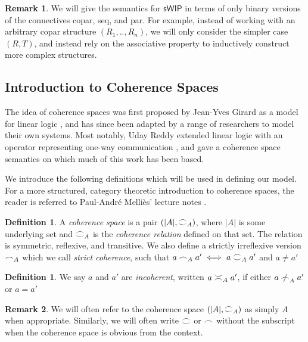 \documentclass[11pt, oneside]{article}
\theoremstyle{plain}
\theoremstyle{definition}
\newtheorem{definition}[theorem]{Definition}
\newtheorem*{remark}{Remark}
\newcommand{\sSys}{{\mathsf{sWIP}}}%
\newcommand{\coh}[1][]{\mathrel{\vcenter{\offinterlineskip\hbox{$\frown$}\vskip0.2ex\hbox{$\smile$}}_{\ifx\\#1\\\else#1\fi}}}
\newcommand{\incoh}[1][]{\mathrel{\vcenter{\offinterlineskip\hbox{$\smile$}\vskip0.2ex\hbox{$\frown$}}_{\ifx\\#1\\\else#1\fi}}}
\newcommand{\scoh}[1][]{\mathrel{\frown}_{\ifx\\#1\\\else#1\fi}}
\newcommand{\notscoh}[1][]{\mathrel{\ooalign{$\frown$\cr\hidewidth$/$\hidewidth}}_{\ifx\\#1\\\else#1\fi}}
\begin{document}
\begin{remark}
We will give the semantics for $\sSys$ in terms of only binary versions of the connectives copar, seq, and par.
For example, instead of working with an arbitrary copar structure $(R_1,..,R_n)$, we will only consider the simpler case $(R,T)$, and instead rely on the associative property to inductively construct more complex structures.
\end{remark}

\subsection{Introduction to Coherence Spaces}
The idea of coherence spaces was first proposed by Jean-Yves Girard as a model for linear logic \cite{girard1987linear}, and has since been adapted by a range of researchers to model their own systems.
Most notably, Uday Reddy extended linear logic with an operator representing one-way communication \cite{reddy1993all}, and gave a coherence space semantics on which much of this work has been based.

We introduce the following definitions which will be used in defining our model.
For a more structured, category theoretic introduction to coherence spaces, the reader is referred to Paul-André Melliès' lecture notes \cite{mellies2000survival}.

\begin{definition}
    A \textit{coherence space} is a pair $(|A|,\coh[A])$, where $|A|$ is some underlying set and $\coh[A]$ is the \textit{coherence relation} defined on that set.
    The relation is symmetric, reflexive, and transitive.
    We also define a strictly irreflexive version $\scoh[A]$ which we call \textit{strict coherence}, such that $a\scoh[A]a' \iff a\coh[A]a'$ and $a\not=a'$
\end{definition}

\begin{definition}
    We say $a$ and $a'$ are \textit{incoherent}, written $a \incoh[A] a'$, if either $a \notscoh[A] a'$ or $a=a'$
\end{definition}

\begin{remark}
    We will often refer to the coherence space $(|A|,\coh[A])$ as simply $A$ when appropriate.
    Similarly, we will often write $\coh$ or $\scoh$ without the subscript when the coherence space is obvious from the context.
\end{remark}
\end{document}
